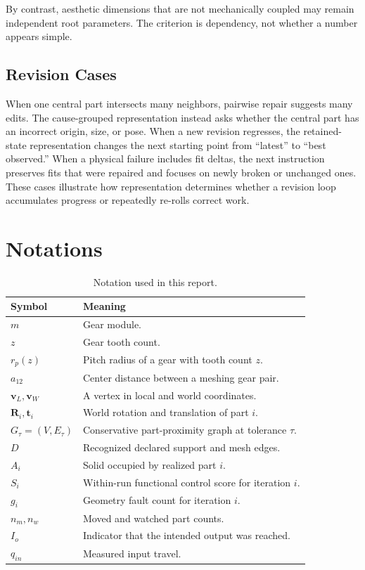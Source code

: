 \documentclass[10pt]{article}
\begin{document}
By contrast, aesthetic dimensions that are not mechanically coupled may remain independent
root parameters. The criterion is dependency, not whether a number appears simple.

\subsection{Revision Cases}

When one central part intersects many neighbors, pairwise repair suggests many edits. The
cause-grouped representation instead asks whether the central part has an incorrect origin,
size, or pose. When a new revision regresses, the retained-state representation changes the
next starting point from ``latest'' to ``best observed.'' When a physical failure includes
fit deltas, the next instruction preserves fits that were repaired and focuses on newly
broken or unchanged ones. These cases illustrate how representation determines whether a
revision loop accumulates progress or repeatedly re-rolls correct work.

\section{Notations}

\begin{table}[ht]
\centering
\caption{Notation used in this report.}
\begin{tabularx}{\linewidth}{@{}lX@{}}
\toprule
Symbol & Meaning \\
\midrule
$m$ & Gear module. \\
$z$ & Gear tooth count. \\
$r_p(z)$ & Pitch radius of a gear with tooth count $z$. \\
$a_{12}$ & Center distance between a meshing gear pair. \\
$\mathbf v_L,\mathbf v_W$ & A vertex in local and world coordinates. \\
$\mathbf R_i,\mathbf t_i$ & World rotation and translation of part $i$. \\
$G_\tau=(V,E_\tau)$ & Conservative part-proximity graph at tolerance $\tau$. \\
$D$ & Recognized declared support and mesh edges. \\
$A_i$ & Solid occupied by realized part $i$. \\
$S_i$ & Within-run functional control score for iteration $i$. \\
$g_i$ & Geometry fault count for iteration $i$. \\
$n_m,n_w$ & Moved and watched part counts. \\
$I_o$ & Indicator that the intended output was reached. \\
$q_{in}$ & Measured input travel. \\
\bottomrule
\end{tabularx}
\end{table}
\end{document}
